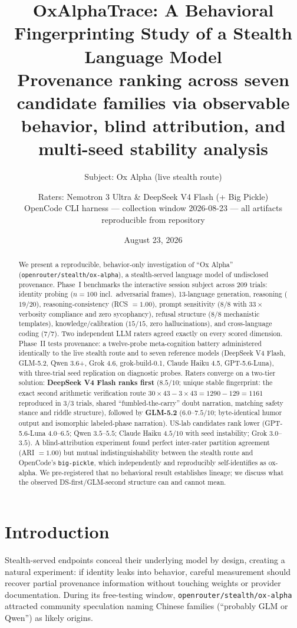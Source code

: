\documentclass[11pt,a4paper]{article}
\title{\textbf{OxAlphaTrace}: A Behavioral Fingerprinting Study of a Stealth Language Model\\
\large Provenance ranking across seven candidate families via observable behavior, blind attribution, and multi-seed stability analysis}
\author{Subject: Ox Alpha (live stealth route) \and Raters: Nemotron 3 Ultra \& DeepSeek V4 Flash (+ Big Pickle)\\
\normalsize OpenCode CLI harness --- collection window 2026-08-23 --- all artifacts reproducible from repository}
\date{August 23, 2026}
\begin{document}
\maketitle

\begin{abstract}
We present a reproducible, behavior-only investigation of ``Ox Alpha'' (\texttt{openrouter/stealth/ox-alpha}), a stealth-served language model of undisclosed provenance. Phase~I benchmarks the interactive session subject across 209 trials: identity probing ($n{=}100$ incl.\ adversarial frames), 13-language generation, reasoning ($19/20$), reasoning-consistency (RCS $=1.00$), prompt sensitivity ($8/8$ with $33\times$ verbosity compliance and zero sycophancy), refusal structure ($8/8$ mechanistic templates), knowledge/calibration ($15/15$, zero hallucinations), and cross-language coding ($7/7$). Two independent LLM raters agreed exactly on every scored dimension. Phase~II tests provenance: a twelve-probe meta-cognition battery administered identically to the live stealth route and to seven reference models (DeepSeek V4 Flash, GLM-5.2, Qwen 3.6+, Grok 4.6, grok-build-0.1, Claude Haiku 4.5, GPT-5.6-Luna), with three-trial seed replication on diagnostic probes. Raters converge on a two-tier solution: \textbf{DeepSeek V4 Flash ranks first} ($8.5/10$; unique stable fingerprint: the exact second arithmetic verification route $30{\times}43{-}3{\times}43 = 1290{-}129 = 1161$ reproduced in $3/3$ trials, shared ``fumbled-the-carry'' doubt narration, matching safety stance and riddle structure), followed by \textbf{GLM-5.2} ($6.0$--$7.5/10$; byte-identical humor output and isomorphic labeled-phase narration). US-lab candidates rank lower (GPT-5.6-Luna $4.0$--$6.5$; Qwen $3.5$--$5.5$; Claude Haiku $4.5/10$ with seed instability; Grok $3.0$--$3.5$). A blind-attribution experiment found perfect inter-rater partition agreement (ARI $=1.00$) but mutual indistinguishability between the stealth route and OpenCode's \texttt{big-pickle}, which independently and reproducibly self-identifies as ox-alpha. We pre-registered that no behavioral result establishes lineage; we discuss what the observed DS-first/GLM-second structure can and cannot mean.
\end{abstract}

\section{Introduction}

Stealth-served endpoints conceal their underlying model by design, creating a natural experiment: if identity leaks into behavior, careful measurement should recover partial provenance information without touching weights or provider documentation. During its free-testing window, \texttt{openrouter/stealth/ox-alpha} attracted community speculation naming Chinese families (``probably GLM or Qwen'') as likely origins.
\end{document}
